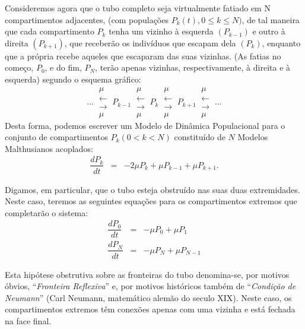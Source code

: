     Consideremos agora que o tubo completo seja virtualmente fatiado em N compartimentos adjacentes, (com populações \(P_k(t), 0 \le k \le N)\), de tal maneira que cada compartimento \(P_k\) tenha um vizinho à esquerda \((P_{k-1})\) e outro à direita \((P_{k+1})\), que receberão os indivíduos que escapam dela \((P_k)\), enquanto que a própria recebe aqueles que escaparam das suas vizinhas. (As fatias no começo, \(P_0\), e do fim, \(P_N\), terão apenas vizinhas, respectivamente, à direita e à esquerda) segundo o esquema gráfico:
    \[\ldots\
    \substack{\mu \\ \longleftarrow \\[-0.1cm] \longrightarrow \\ \mu}\ P_{k-1}\
    \substack{\mu \\ \longleftarrow \\[-0.1cm] \longrightarrow \\ \mu}\ P_{k}\
    \substack{\mu \\ \longleftarrow \\[-0.1cm] \longrightarrow \\ \mu}\ P_{k+1}\
    \substack{\mu \\ \longleftarrow \\[-0.1cm] \longrightarrow \\ \mu}\ \ldots
    \]
    Desta forma, podemos escrever um Modelo de Dinâmica Populacional para o conjunto de compartimentos \(P_k (0 < k < N)\) constituído de \(N\) Modelos Malthusianos acoplados:
    \begin{eqnarray}\label{eq:moddinamicapcompartimentos}
    \dfrac{dP_k}{dt} &=& -2\mu P_k + \mu P_{k-1} + \mu P_{k+1}.
    \end{eqnarray}

    Digamos, em particular, que o tubo esteja obstruído nas suas duas extremidades. Neste caso, teremos as seguintes equações para os compartimentos extremos que completarão o sistema:
    \begin{eqnarray}\label{eq:moddinamicapcompartimentossistema}
    \dfrac{dP_0}{dt} &=& -\mu P_{0} + \mu P_{1} \\
    \dfrac{dP_N}{dt} &=& -\mu P_{N} + \mu P_{N-1}
    \end{eqnarray}

    Esta hipótese obstrutiva sobre as fronteiras do tubo denomina-se, por motivos óbvios, ``\textit{Fronteira Reflexiva}'' e, por motivos históricos também de ``\textit{Condição de Neumann}'' (Carl Neumann, matemático alemão do seculo XIX). Neste caso, os compartimentos extremos têm conexões apenas com uma vizinha e está fechada na face final.

